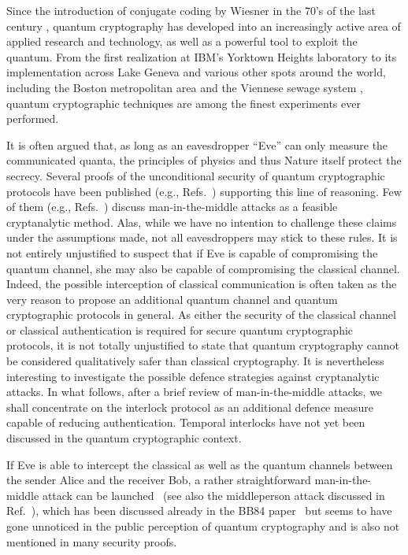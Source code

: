 \documentclass{ws-ijqi}
\begin{document}
Since the introduction of conjugate coding by Wiesner
in the 70's of the last century \cite{wiesner},  quantum cryptography
\cite{benn-82,benn-84,ekert91,benn-92,gisin-qc-rmp,pflmubpskwjz}
has developed into an increasingly active area of applied research and technology,
as well as a powerful tool to exploit the quantum.
From the first realization at IBM's Yorktown Heights laboratory \cite{benn-92}
to its implementation across Lake Geneva \cite{gisin-qc-rmp} and
various other spots around the world, including
the Boston metropolitan area \cite{ell-co-05}
and the Viennese sewage system \cite{pflmubpskwjz},
quantum cryptographic techniques are among the finest experiments ever performed.


It is often argued that, as long as an eavesdropper ``Eve''
can only measure the communicated quanta,
the principles of physics and thus Nature itself protect the secrecy.
Several proofs of the unconditional security of quantum cryptographic protocols have been
published (e.g., Refs.~\cite{shpr-2000,may-2001}) supporting this line
of reasoning.
Few of them (e.g., Refs.~\cite{lue-98,lue-99,Gil-Ham-2000})
discuss man-in-the-middle attacks as a feasible cryptanalytic method.
Alas, while we have no intention to challenge these claims under the assumptions made,
not all eavesdroppers may stick to these rules.
It is not entirely unjustified to suspect that if
Eve is capable of compromising the quantum channel,
she may also be capable of compromising the classical channel.
Indeed, the possible interception of classical communication
is often taken as the very reason to propose an additional quantum channel
and quantum cryptographic protocols in general.
As either the security of the classical channel
or classical authentication is required for secure quantum cryptographic
protocols, it is not totally unjustified to state that
quantum cryptography cannot be considered qualitatively safer than classical cryptography.
It is nevertheless interesting to investigate the possible defence strategies against
cryptanalytic attacks. In what follows, after a brief review
of man-in-the-middle attacks, we shall concentrate on the interlock protocol as
an additional defence measure capable of reducing authentication.
Temporal interlocks have not yet been discussed in the quantum cryptographic context.

If Eve is able to intercept the classical as well as the quantum channels
between the sender Alice and the receiver Bob,
a rather straightforward man-in-the-middle attack can be launched~\cite{benn-84,benn-92,kuhn-03,pps-04,peev-04}
(see also the middleperson attack discussed in Ref.~\cite{BengioGrDeGoQu91}),
which has been discussed already in the BB84 paper~\cite{benn-84} but
seems to have gone unnoticed in the public perception of quantum cryptography
and is also not mentioned in many security proofs.
\end{document}
